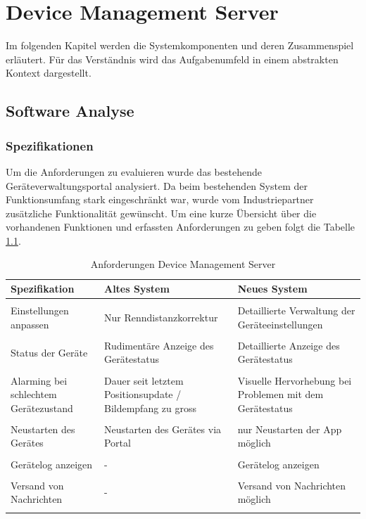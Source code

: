 \chapter{Device Management Server}
\label{sec:devmgmtsrv}
Im folgenden Kapitel werden die Systemkomponenten und deren Zusammenspiel erläutert. Für das Verständnis wird das Aufgabenumfeld in einem abstrakten Kontext dargestellt. 

\section{Software Analyse}

\subsection{Spezifikationen}
Um die Anforderungen zu evaluieren wurde das bestehende Geräteverwaltungsportal analysiert. Da beim bestehenden System der Funktionsumfang stark eingeschränkt war, wurde vom Industriepartner zusätzliche Funktionalität gewünscht.
Um eine kurze Übersicht über die vorhandenen Funktionen und erfassten Anforderungen zu geben folgt die Tabelle \ref{tab:anforderungendevmgmtsrv}.

\begin{longtable}{  p{3.5cm} | p{4.3cm} | p{4.3cm} }

    \textbf{Spezifikation} & \textbf{Altes System} & \textbf{Neues System} \\ [1ex] \hline \hline & &  \\ [-1.5ex]
    Einstellungen anpassen & Nur Renndistanzkorrektur & Detaillierte Verwaltung der Geräteeinstellungen\\ [1ex] \hline & &  \\ [-1.5ex]
    Status der Geräte & Rudimentäre Anzeige des Gerätestatus & Detaillierte Anzeige des Gerätestatus\\ [1ex] \hline & &  \\ [-1.5ex]
     Alarming bei schlechtem Gerätezustand & Dauer seit letztem Positionsupdate / Bildempfang zu gross & Visuelle Hervorhebung bei Problemen mit dem Gerätestatus \\ [1ex] \hline & &  \\ [-1.5ex]
    Neustarten des Gerätes & Neustarten des Gerätes via Portal & nur Neustarten der App möglich\\ [1ex] \hline & &  \\ [-1.5ex]
    Gerätelog anzeigen & - & Gerätelog anzeigen\\ [1ex] \hline & &  \\ [-1.5ex]
    Versand von Nachrichten & - & Versand von Nachrichten möglich\\ [1ex] 
\caption{Anforderungen Device Management Server}
\label{tab:anforderungendevmgmtsrv}
\end{longtable}


